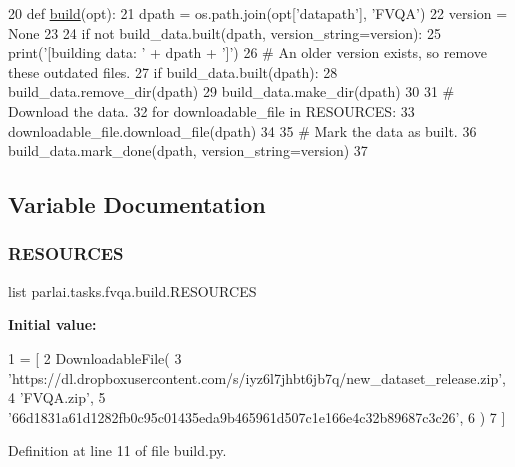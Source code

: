 \begin{DoxyCode}
20 \textcolor{keyword}{def }\hyperlink{namespacedialog__babi__feedback_1_1build_a7a9d289f7493a5ded13c4b7f071b6184}{build}(opt):
21     dpath = os.path.join(opt[\textcolor{stringliteral}{'datapath'}], \textcolor{stringliteral}{'FVQA'})
22     version = \textcolor{keywordtype}{None}
23 
24     \textcolor{keywordflow}{if} \textcolor{keywordflow}{not} build\_data.built(dpath, version\_string=version):
25         print(\textcolor{stringliteral}{'[building data: '} + dpath + \textcolor{stringliteral}{']'})
26         \textcolor{comment}{# An older version exists, so remove these outdated files.}
27         \textcolor{keywordflow}{if} build\_data.built(dpath):
28             build\_data.remove\_dir(dpath)
29         build\_data.make\_dir(dpath)
30 
31         \textcolor{comment}{# Download the data.}
32         \textcolor{keywordflow}{for} downloadable\_file \textcolor{keywordflow}{in} RESOURCES:
33             downloadable\_file.download\_file(dpath)
34 
35         \textcolor{comment}{# Mark the data as built.}
36         build\_data.mark\_done(dpath, version\_string=version)
37 \end{DoxyCode}


\subsection{Variable Documentation}
\mbox{\label{namespaceparlai_1_1tasks_1_1fvqa_1_1build_a3e436caffe57471e54ae132803852fe7}} 
\subsubsection{\texorpdfstring{R\+E\+S\+O\+U\+R\+C\+ES}{RESOURCES}}
{\footnotesize\ttfamily list parlai.\+tasks.\+fvqa.\+build.\+R\+E\+S\+O\+U\+R\+C\+ES}

{\bfseries Initial value\+:}
\begin{DoxyCode}
1 =  [
2     DownloadableFile(
3         \textcolor{stringliteral}{'https://dl.dropboxusercontent.com/s/iyz6l7jhbt6jb7q/new\_dataset\_release.zip'},
4         \textcolor{stringliteral}{'FVQA.zip'},
5         \textcolor{stringliteral}{'66d1831a61d1282fb0c95c01435eda9b465961d507c1e166e4c32b89687c3c26'},
6     )
7 ]
\end{DoxyCode}


Definition at line 11 of file build.\+py.

